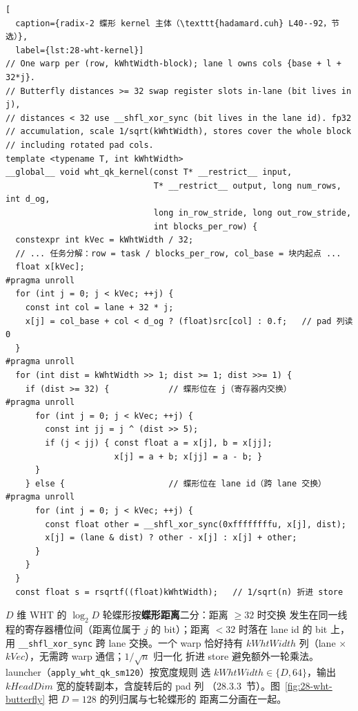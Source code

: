 \begin{lstlisting}[
  caption={radix-2 蝶形 kernel 主体（\texttt{hadamard.cuh} L40--92，节选）},
  label={lst:28-wht-kernel}]
// One warp per (row, kWhtWidth-block); lane l owns cols {base + l + 32*j}.
// Butterfly distances >= 32 swap register slots in-lane (bit lives in j),
// distances < 32 use __shfl_xor_sync (bit lives in the lane id). fp32
// accumulation, scale 1/sqrt(kWhtWidth), stores cover the whole block
// including rotated pad cols.
template <typename T, int kWhtWidth>
__global__ void wht_qk_kernel(const T* __restrict__ input,
                              T* __restrict__ output, long num_rows, int d_og,
                              long in_row_stride, long out_row_stride,
                              int blocks_per_row) {
  constexpr int kVec = kWhtWidth / 32;
  // ... 任务分解：row = task / blocks_per_row, col_base = 块内起点 ...
  float x[kVec];
#pragma unroll
  for (int j = 0; j < kVec; ++j) {
    const int col = lane + 32 * j;
    x[j] = col_base + col < d_og ? (float)src[col] : 0.f;   // pad 列读 0
  }
#pragma unroll
  for (int dist = kWhtWidth >> 1; dist >= 1; dist >>= 1) {
    if (dist >= 32) {            // 蝶形位在 j（寄存器内交换）
#pragma unroll
      for (int j = 0; j < kVec; ++j) {
        const int jj = j ^ (dist >> 5);
        if (j < jj) { const float a = x[j], b = x[jj];
                      x[j] = a + b; x[jj] = a - b; }
      }
    } else {                     // 蝶形位在 lane id（跨 lane 交换）
#pragma unroll
      for (int j = 0; j < kVec; ++j) {
        const float other = __shfl_xor_sync(0xffffffffu, x[j], dist);
        x[j] = (lane & dist) ? other - x[j] : x[j] + other;
      }
    }
  }
  const float s = rsqrtf((float)kWhtWidth);   // 1/sqrt(n) 折进 store
\end{lstlisting}

$D$ 维 WHT 的 $\log_2 D$ 轮蝶形按\textbf{蝶形距离}二分：距离 $\ge 32$ 时交换
发生在同一线程的寄存器槽位间（距离位属于 $j$ 的 bit）；距离 $<32$ 时落在 lane id
的 bit 上，用 \texttt{\_\_shfl\_xor\_sync} 跨 lane 交换。一个 warp 恰好持有
$kWhtWidth$ 列（lane $\times$ $kVec$），无需跨 warp 通信；$1/\sqrt{n}$ 归一化
折进 store 避免额外一轮乘法。launcher（\texttt{apply\_wht\_qk\_sm120}）按宽度规则
选 $kWhtWidth \in \{D, 64\}$，输出 $kHeadDim$ 宽的旋转副本，含旋转后的 pad 列
（28.3.3~节）。图~\ref{fig:28-wht-butterfly} 把 $D{=}128$ 的列归属与七轮蝶形的
距离二分画在一起。

